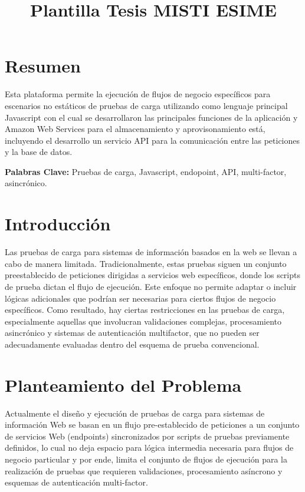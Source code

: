\documentclass[10pt]{article}
\title{Plantilla Tesis MISTI ESIME}
\begin{document}

\cleardoublepage

\newpage
\tableofcontents

\newpage
\section{Resumen}
\justify
Esta plataforma permite la ejecución de flujos de negocio específicos para escenarios no estáticos de pruebas de carga utilizando como lenguaje principal Javascript con el cual se desarrollaron las principales funciones de la aplicación y Amazon Web Services para el almacenamiento y aprovisonamiento está, incluyendo el desarrollo un servicio API para la comunicación entre las peticiones y la base de datos.

\par\vspace{\baselineskip}
\justify
\textbf{Palabras Clave:} Pruebas de carga, Javascript, endopoint, API, multi-factor, asincrónico.

\par\vspace{\baselineskip}

\section{Introducción}
\justify
Las pruebas de carga para sistemas de información basados en la web se llevan a cabo de manera limitada. Tradicionalmente, estas pruebas siguen un conjunto preestablecido de peticiones dirigidas a servicios web específicos, donde los scripts de prueba dictan el flujo de ejecución. Este enfoque no permite adaptar o incluir lógicas adicionales que podrían ser necesarias para ciertos flujos de negocio específicos. Como resultado, hay ciertas restricciones en las pruebas de carga, especialmente aquellas que involucran validaciones complejas, procesamiento asincrónico y sistemas de autenticación multifactor, que no pueden ser adecuadamente evaluadas dentro del esquema de prueba convencional.
\section{Planteamiento del Problema}
\justify
Actualmente el diseño y ejecución de pruebas de carga para sistemas de información Web se basan en un flujo pre-establecido
de peticiones a un conjunto de servicios Web (endpoints) sincronizados por scripts de pruebas previamente definidos, lo cual
no deja espacio para lógica intermedia necesaria para flujos de negocio particular y por ende, limita el conjunto de flujos
de ejecución para la realización de pruebas que requieren validaciones, procesamiento asíncrono y esquemas de autenticación multi-factor.
\end{document}
